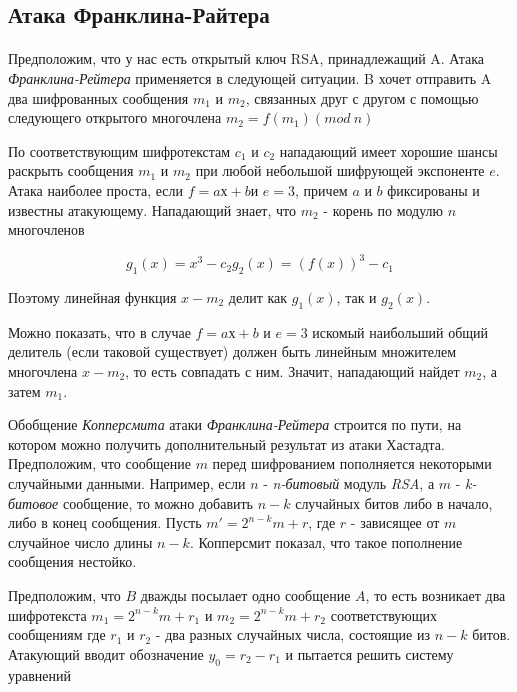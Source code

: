 \subsection{Атака Франклина-Райтера}

\paragraph{} Предположим, что у нас есть открытый ключ RSA, принадлежащий A. Атака \textit{Франклина-Рейтера} применяется в следующей ситуации. B хочет отправить A два шифрованных 
  сообщения $m_1$ и $m_2$, связанных друг с другом с помощью следующего открытого многочлена $ m_2 = f(m_1)(mod \: n) $
  
  По соответствующим шифротекстам $c_1$ и $c_2$ нападающий имеет хорошие шансы раскрыть сообщения $m_1$ и $m_2$ при любой небольшой
  шифрующей экспоненте $e$. Атака наиболее проста, если $f = aх + b $и $e=3$, причем $a$ и $b$ фиксированы и известны атакующему. 
  Нападающий знает, что $m_2$ - корень по модулю $n$ многочленов
  
    \begin{equation}
      g_1(x) = x^3 - c_2 g_2(x) = (f(x))^3 - c_1
    \end{equation}

  Поэтому линейная функция $x - m_{2}$ делит как $ g_1(x) $, так и $ g_2(x) $.
  
  Можно показать, что в случае $f = aх + b$ и $e = 3$ искомый наибольший общий делитель (если таковой существует) должен быть линейным множителем 
  многочлена $x - m_2$, то есть совпадать с ним. Значит, нападающий найдет $m_2$, а затем $m_1$.
  
  Обобщение \textit{Копперсмита} атаки \textit{Франклина-Рейтера} строится по пути, на котором можно получить дополнительный результат из атаки Хастадта. Предположим, что сообщение $m$ 
  перед шифрованием пополняется некоторыми случайными данными. Например, если $n$ - \textit{n-битовый} модуль \textit{RSA}, а $m$ - \textit{k-битовое} сообщение, 
  то можно добавить $n-k$ случайных битов либо в начало, либо в конец сообщения. Пусть $m' = 2^{n-k}m + r $, где $r$ - зависящее от 
  $m$ случайное число длины $n-k$. Копперсмит показал, что такое пополнение сообщения нестойко.
  
  Предположим, что $B$ дважды посылает одно сообщение $A$, то есть возникает два шифротекста $ m_1 = 2^{n-k}m + r_1 $ и
  $ m_2 = 2^{n-k}m + r_2 $ соответствующих сообщениям где $r_1$ и $r_2$ - два разных случайных числа, состоящие из 
  $n - k$ битов. Атакующий вводит обозначение $ y_0 = r_2 - r_1 $ и пытается решить
  систему уравнений
  
